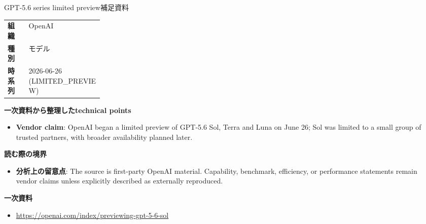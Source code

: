 \begin{technicalnote}{GPT-5.6 series limited preview}{補足資料}
\begin{tabularx}{\linewidth}{@{}>{\bfseries}p{0.22\linewidth}X@{}}
組織 & OpenAI \\
種別 & モデル \\
時系列 & 2026-06-26 (LIMITED\_PREVIEW) \\
\end{tabularx}
\smallskip
{\bfseries 一次資料から整理したtechnical points}
\begin{itemize}[leftmargin=1.5em,itemsep=0.35em]
\item \textbf{Vendor claim}: OpenAI began a limited preview of GPT-5.6 Sol, Terra and Luna on June 26; Sol was limited to a small group of trusted partners, with broader availability planned later.
\end{itemize}
{\bfseries 読む際の境界}
\begin{itemize}[leftmargin=1.5em,itemsep=0.35em]
\item \textbf{分析上の留意点}: The source is first-party OpenAI material. Capability, benchmark, efficiency, or performance statements remain vendor claims unless explicitly described as externally reproduced.
\end{itemize}
{\bfseries 一次資料}
\begingroup\sloppy
\begin{itemize}[leftmargin=1.5em,itemsep=0.25em]
\item {\scriptsize\url{https://openai.com/index/previewing-gpt-5-6-sol}}
\end{itemize}
\endgroup
\end{technicalnote}
\medskip

